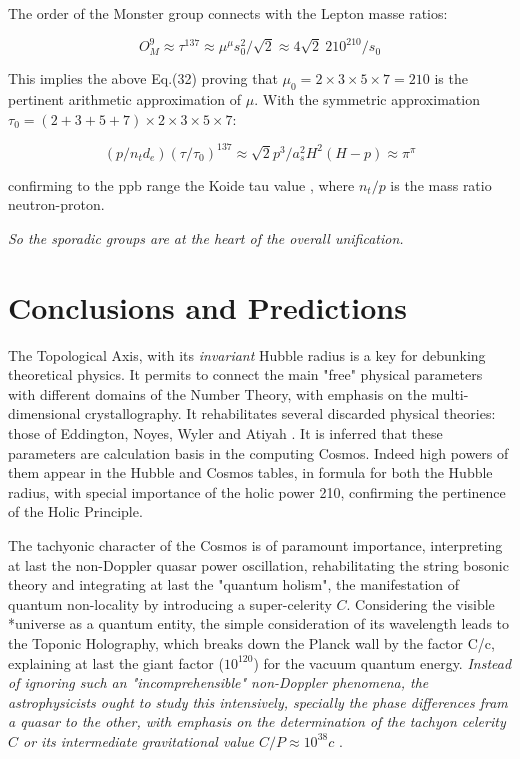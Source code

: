 \documentclass[a4paper,9pt]{article}
\begin{document}
 The order of the Monster group connects with the Lepton masse ratios:
 
 \begin{equation}\label{Eq53}
 O_M^9 \approx \tau^{137} \approx \mu^\mu s_0^2/\sqrt2 \approx 4 \sqrt2 ~210^{210}/s_0     
 \end{equation}
 
This implies the above Eq.(32) proving that $\mu_0 = 2\times 3\times 5\times 7 = 210$ is the pertinent arithmetic approximation of $\mu$. With the symmetric approximation $\tau_0 = (2+3+5+7) \times 2\times 3\times 5\times 7 $: 
 
\begin{equation}\label{Eq54}
 (p/n_td_e)(\tau/\tau_0 )^{137} \approx \sqrt2 p^3/a_s^2H^2(H-p) \approx \pi^{\pi}  
 \end{equation}

confirming to the ppb range the Koide tau value \cite{Koide}, where $n_t/p$ is the mass ratio neutron-proton.

\textit{So the sporadic groups are at the heart of the overall unification.}
 
 
  
 
\section{Conclusions and Predictions}

The Topological Axis, with its \textit{invariant} Hubble radius is a key for debunking theoretical physics. It permits to connect the main "free" physical parameters with different domains of the Number Theory, with emphasis on the  multi-dimensional crystallography. It rehabilitates several discarded physical theories: those of Eddington\cite{Eddington}, Noyes\cite{Noyes}, Wyler\cite{Wyler} and Atiyah \cite{Atiyah}. It is inferred that these parameters are calculation basis in the computing Cosmos. Indeed high powers of them appear in the Hubble and Cosmos tables, in formula for both the Hubble radius, with special importance of the holic power 210, confirming the pertinence of the Holic Principle.

The tachyonic character of the Cosmos is of paramount importance, interpreting at last the non-Doppler quasar power oscillation, rehabilitating the string bosonic theory and integrating at last the "quantum holism", the manifestation of quantum non-locality by introducing a super-celerity $C$. Considering the visible *universe as a quantum entity, the simple consideration of its wavelength leads to the Toponic Holography, which breaks down the Planck wall by the factor C/c, explaining at last the giant factor ($10^{120}$) for the vacuum quantum energy. \textit{Instead of ignoring such an "incomprehensible" non-Doppler phenomena, the astrophysicists ought to study this intensively, specially the phase differences fram a quasar to the other, with emphasis on the determination of the tachyon celerity $C$ or its intermediate gravitational value $C/P \approx 10^{38}c$} \cite{Sanchez3}. 
\end{document}
